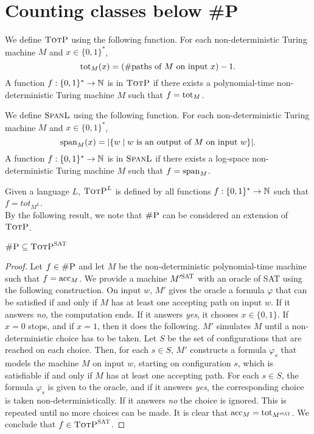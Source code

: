 \section{Counting classes below \#P}

We define $\totp$ using the following function. For each non-deterministic Turing machine $M$ and $x\in\{0,1\}^*$,
\[
	\tot_M(x) = (\text{\#paths of $M$ on input $x$}) - 1.
\]
A function $f:\{0,1\}^*\to\N$ is in $\totp$ if there exists a polynomial-time non-deterministic Turing machine $M$ such that $f = \tot_M$.

We define $\spanl$ using the following function. For each non-deterministic Turing machine $M$ and $x\in\{0,1\}^*$,
\[
	\sp_M(x) = \vert\{w \mid \text{$w$ is an output of $M$ on input $w$}\}\vert.
\]
A function $f:\{0,1\}^*\to\N$ is in $\spanl$ if there exists a log-space non-deterministic Turing machine $M$ such that $f = \sp_M$.

Given a language $L$, $\totp^{L}$ is defined by all functions $f:\{0,1\}^*\to\N$ such that $f = tot_{M^L}$.
\\

By the following result, we note that $\shp$ can be considered an extension of $\totp$.

\begin{theo}
	$\shp \subseteq \totp^{\textsc{SAT}}$
\end{theo}
\begin{proof}
	Let $f\in\shp$ and let $M$ be the non-deterministic polynomial-time machine such that $f = \acc_M$. We provide a machine $M'^{\textsc{SAT}}$ with an oracle of SAT using the following construction. On input $w$, $M'$ gives the oracle a formula $\varphi$ that can be satisfied if and only if $M$ has at least one accepting path on input $w$. If it answers {\it no}, the computation ends. If it answers {\it yes}, it chooses $x\in\{0,1\}$. If $x = 0$ stops, and if $x = 1$, then it does the following. $M'$ simulates $M$ until a non-deterministic choice has to be taken. Let $S$ be the set of configurations that are reached on each choice. Then, for each $s\in S$, $M'$ constructs a formula $\varphi_s$ that models the machine $M$ on input $w$, starting on configuration $s$, which is satisfiable if and only if $M$ has at least one accepting path. For each $s\in S$, the formula $\varphi_s$ is given to the oracle, and if it answers {\it yes}, the corresponding choice is taken non-deterministically. If it answers {\it no} the choice is ignored. This is repeated until no more choices can be made. It is clear that $\acc_M = \tot_{M'^{\textsc{SAT}}}$. We conclude that $f\in\totp^{\textsc{SAT}}$.
\end{proof}

